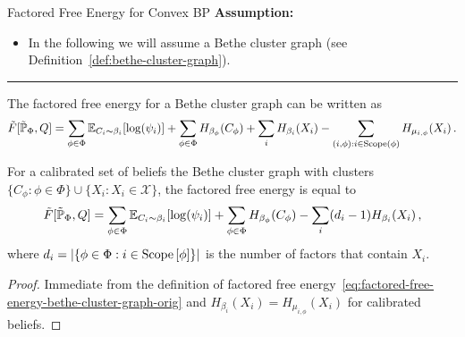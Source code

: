 \begin{frame}{Factored Free Energy for Convex BP}
\textbf{Assumption:}
\begin{itemize}
    \item In the following we will assume a Bethe cluster graph (see Definition~\ref{def:bethe-cluster-graph}).
\end{itemize}
\pause
\hrule
The factored free energy for a Bethe cluster graph can be written as
\begin{equation}
    \label{eq:factored-free-energy-bethe-cluster-graph-orig}
        \tilde{F}[\tilde{\Pb}_{\Phi},Q] = \sum_{\phi \in \Phi} \E_{C_i \sim \beta_i}[\log(\psi_i)] + \sum_{\phi \in \Phi} H_{\beta_{\phi}}(C_\phi) + \sum_{i} H_{\beta_{i}}(X_i) - \sum_{(i,\phi): i \in \Scope(\phi)} H_{\mu_{i,\phi}}(X_i)\,.
\end{equation}
\pause
\begin{proposition}
For a calibrated set of beliefs the Bethe cluster graph with clusters $\{C_\phi : \phi \in \Phi\} \cup \{ X_i : X_i \in \mathcal{X}\}$, the factored free energy is equal to
\begin{equation}
    \label{eq:factored-free-energy-bethe-cluster-graph}
   \tilde{F}[\tilde{\Pb}_{\Phi},Q] = \sum_{\phi \in \Phi} \E_{C_i \sim \beta_i}[\log(\psi_i)] + \sum_{\phi \in \Phi} H_{\beta_{\phi}}(C_\phi) - \sum_{i} (d_i - 1) H_{\beta_{i}}(X_i)\,,
\end{equation}
where $d_i = \abs{\{ \phi \in \Phi : i \in \Scope[\phi]\}}$ is the number of factors that contain $X_i$.
\end{proposition}
\pause
\begin{proof}
    Immediate from the definition of factored free energy~\eqref{eq:factored-free-energy-bethe-cluster-graph-orig} and $H_{\beta_i}(X_i) = H_{\mu_{i,\phi}}(X_i)$ for calibrated beliefs.
\end{proof}
\end{frame}

